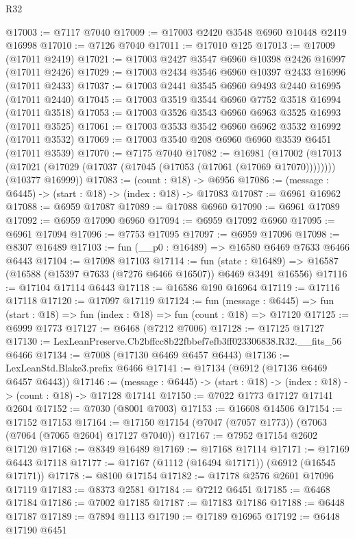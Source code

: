 \begin{lexlean}{R32}
\begin{coremodule}
@17003 := @7117 @7040
@17009 := @17003 @2420 @3548 @6960 @10448 @2419 @16998
@17010 := @7126 @7040
@17011 := @17010 @125
@17013 := @17009 (@17011 @2419)
@17021 := @17003 @2427 @3547 @6960 @10398 @2426 @16997 (@17011 @2426)
@17029 := @17003 @2434 @3546 @6960 @10397 @2433 @16996 (@17011 @2433)
@17037 := @17003 @2441 @3545 @6960 @9493 @2440 @16995 (@17011 @2440)
@17045 := @17003 @3519 @3544 @6960 @7752 @3518 @16994 (@17011 @3518)
@17053 := @17003 @3526 @3543 @6960 @6963 @3525 @16993 (@17011 @3525)
@17061 := @17003 @3533 @3542 @6960 @6962 @3532 @16992 (@17011 @3532)
@17069 := @17003 @3540 @208 @6960 @6960 @3539 @6451 (@17011 @3539)
@17070 := @7175 @7040
@17082 := @16981
    (@17002
      (@17013 (@17021 (@17029 (@17037 (@17045 (@17053 (@17061 (@17069 @17070))))))))
      (@10377 @16999))
@17083 := (count : @18) -> @6956
@17086 := (message : @6445) -> (start : @18) -> (index : @18) -> @17083
@17087 := @6961 @16962
@17088 := @6959 @17087
@17089 := @17088 @6960
@17090 := @6961 @17089
@17092 := @6959 @17090 @6960
@17094 := @6959 @17092 @6960
@17095 := @6961 @17094
@17096 := @7753 @17095
@17097 := @6959 @17096
@17098 := @8307 @16489
@17103 := fun (__p0 : @16489) => @16580 @6469 @7633 @6466 @6443
@17104 := @17098 @17103
@17114 := fun (state : @16489) =>
  @16587 (@16588 (@15397 @7633 (@7276 @6466 @16507)) @6469 @3491 @16556)
@17116 := @17104 @17114 @6443
@17118 := @16586 @190 @16964
@17119 := @17116 @17118
@17120 := @17097 @17119
@17124 := fun (message : @6445) =>
  fun (start : @18) => fun (index : @18) => fun (count : @18) => @17120
@17125 := @6999 @1773
@17127 := @6468 (@7212 @7006)
@17128 := @17125 @17127
@17130 := LexLeanPreserve.Cb2bffcc8b22fbbef7efb3ff023306838.R32.__fits_56 @6466
@17134 := @7008 (@17130 @6469 @6457 @6443)
@17136 := LexLeanStd.Blake3.prefix @6466
@17141 := @17134 (@6912 (@17136 @6469 @6457 @6443))
@17146 := (message : @6445) -> (start : @18) -> (index : @18) -> (count : @18) -> @17128 @17141
@17150 := @7022 @1773 @17127 @17141 @2604
@17152 := @7030 (@8001 @7003)
@17153 := @16608 @14506
@17154 := @17152 @17153
@17164 := @17150 @17154 (@7047 (@7057 @1773)) (@7063 (@7064 (@7065 @2604) @17127 @7040))
@17167 := @7952 @17154 @2602 @17120
@17168 := @8349 @16489
@17169 := @17168 @17114
@17171 := @17169 @6443 @17118
@17177 := @17167 (@1112 (@16494 @17171)) (@6912 (@16545 @17171))
@17178 := @8100 @17154
@17182 := @17178 @2576 @2601 @17096 @17119
@17183 := @8373 @2581
@17184 := @7212 @6451
@17185 := @6468 @17184
@17186 := @7002 @17185
@17187 := @17183 @17186
@17188 := @6448 @17187
@17189 := @7894 @1113
@17190 := @17189 @16965
@17192 := @6448 @17190 @6451

\end{coremodule}
\end{lexlean}
